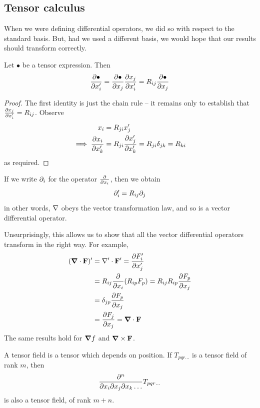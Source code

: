 \documentclass{../template/note}
\begin{document}
    \subsection{Tensor calculus}

    When we were defining differential operators, we did so with respect to the standard basis. But, had we used a different basis, we would hope that our results should transform correctly.

    \begin{proposition}
        Let \(\bullet\) be a tensor expression. Then
        \begin{align*}
            \pd{\bullet}{x_i'} = \pd{\bullet}{x_j} \pd{x_j}{x_i'} = R_{ij} \pd{\bullet}{x_j}
        \end{align*}
    \end{proposition}
    
    \begin{proof}
        The first identity is just the chain rule -- it remains only to establish that \(\pd{x_j}{x_i'} = R_{ij}\). Observe
        \begin{align*}
            x_i &= R_{ji} x_j' \\
            \implies \pd{x_i}{x_k'} &= R_{ji} \pd{x_j'}{x_k'} = R_{ji} \delta_{jk} = R_{ki}
        \end{align*}
        as required.        
    \end{proof}
    
    If we write \(\partial_i\) for the operator \(\pd{}{x_i}\), then we obtain
    \begin{align*}
        \partial_i' = R_{ij} \partial_j
    \end{align*}
    in other words, \(\nabla\) obeys the vector transformation law, and so is a vector differential operator.

    Unsurprisingly, this allows us to show that all the vector differential operators transform in the right way. For example,
    \begin{align*}
        (\div \V F)' &= \del' \cdot \V F ' = \pd{F_i'}{x_j'} \\
        &= R_{ij} \pd{}{x_i}(R_{ip}F_p) = R_{ij}R_{ip} \pd{F_p}{x_j} \\
        &= \delta_{jp} \pd{F_p}{x_j} \\
        &= \pd{F_j}{x_j} = \div \V F
    \end{align*}
    The same results hold for \(\grad f\) and \(\curl \V F\).

    A tensor field is a tensor which depends on position. If \(T_{pqr\dots}\) is a tensor field of rank \(m\), then
    \begin{align*}
        \pd{^n}{x_i \pr x_j \pr x_k \dots} T_{pqr\dots}
    \end{align*}
    is also a tensor field, of rank \(m+n\).
\end{document}
